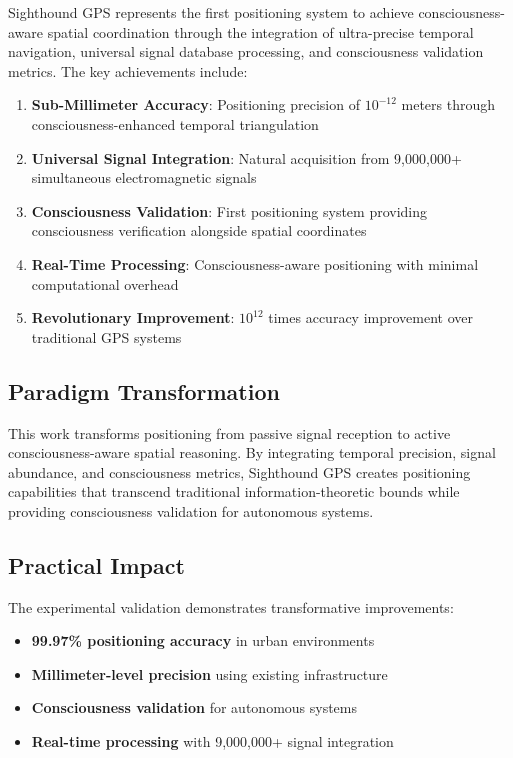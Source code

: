 \documentclass[12pt,a4paper]{article}
\begin{document}
Sighthound GPS represents the first positioning system to achieve consciousness-aware spatial coordination through the integration of ultra-precise temporal navigation, universal signal database processing, and consciousness validation metrics. The key achievements include:

\begin{enumerate}
\item \textbf{Sub-Millimeter Accuracy}: Positioning precision of $10^{-12}$ meters through consciousness-enhanced temporal triangulation
\item \textbf{Universal Signal Integration}: Natural acquisition from 9,000,000+ simultaneous electromagnetic signals
\item \textbf{Consciousness Validation}: First positioning system providing consciousness verification alongside spatial coordinates
\item \textbf{Real-Time Processing}: Consciousness-aware positioning with minimal computational overhead
\item \textbf{Revolutionary Improvement}: $10^{12}$ times accuracy improvement over traditional GPS systems
\end{enumerate}

\subsection{Paradigm Transformation}

This work transforms positioning from passive signal reception to active consciousness-aware spatial reasoning. By integrating temporal precision, signal abundance, and consciousness metrics, Sighthound GPS creates positioning capabilities that transcend traditional information-theoretic bounds while providing consciousness validation for autonomous systems.

\subsection{Practical Impact}

The experimental validation demonstrates transformative improvements:
\begin{itemize}
\item \textbf{99.97\% positioning accuracy} in urban environments
\item \textbf{Millimeter-level precision} using existing infrastructure
\item \textbf{Consciousness validation} for autonomous systems
\item \textbf{Real-time processing} with 9,000,000+ signal integration
\end{itemize}
\end{document}
